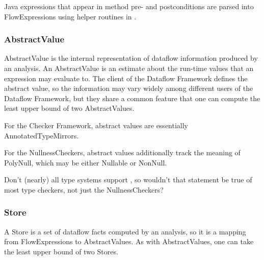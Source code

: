     
    Java expressions that appear in method pre- and postconditions are parsed into FlowExpressions using helper routines in .

    
\subsubsection{AbstractValue}
\label{sec:abstract_value_classes}

    AbstractValue is the internal representation of dataflow information
    produced by an analysis.  An AbstractValue is an estimate about the
    run-time values that an expression may evaluate to.  The client of the
    Dataflow Framework defines the abstract value, so the information may
    vary widely among different users of the Dataflow Framework, but they
    share a common feature that one can compute the least upper bound of
    two AbstractValues.

        
    For the Checker Framework, abstract values are essentially AnnotatedTypeMirrors.
        
        
        
    For the NullnessCheckers, abstract values additionally track the meaning of PolyNull, which may be either Nullable or NonNull.
        
        
\begin{workinprogress}    
Don't (nearly) all type systems support , so wouldn't that
statement be true of most type checkers, not just the NullnessCheckers?
\end{workinprogress}



\subsubsection{Store}
\label{sec:store_classes}

    A Store is a set of dataflow facts computed by an analysis, so it is a mapping from FlowExpressions to AbstractValues.  As with AbstractValues, one can take the least upper bound of two Stores.

